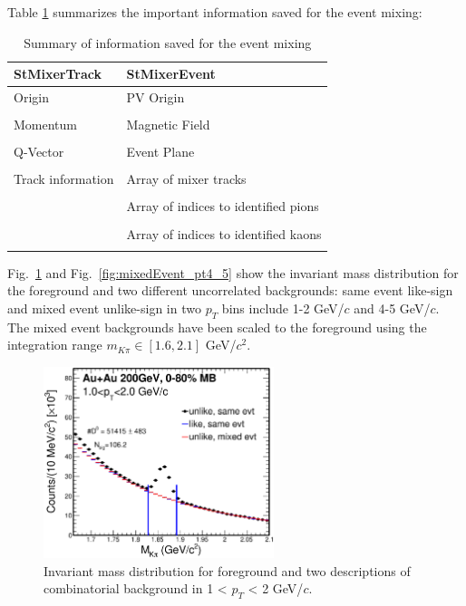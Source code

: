\documentclass[a4paper]{article}
\begin{document}
Table \ref{eventBuf} summarizes the important information saved for the event mixing:

\begin{table}[htp]
\centering
\caption{Summary of information saved for the event mixing}
\label{eventBuf}
\begin{tabular}{ l | l  }
\toprule[1.6pt]
StMixerTrack & StMixerEvent \\
\midrule[1.2pt]
Origin & PV Origin \\
\\
Momentum & Magnetic Field \\
\\
Q-Vector & Event Plane \\
\\
Track information & Array of mixer tracks \\
\\
  &Array of indices to identified pions \\
\\
  & Array of indices to identified kaons \\
\\
\bottomrule[1.6pt]
\end{tabular}
\end{table}

Fig.~\ref{fig:mixedEvent_pt1_2} and Fig.~\ref{fig:mixedEvent_pt4_5} show the invariant mass distribution for the foreground and two different uncorrelated backgrounds: same event like-sign and mixed event unlike-sign in two $p_T$ bins include 1-2 GeV/$c$ and 4-5 GeV/$c$. The mixed event backgrounds have been scaled to the foreground using the integration range $m_{K\pi}\in[1.6,2.1]$ GeV/$c^{2}$.

\begin{figure}[htbp]
\centering
\includegraphics[keepaspectratio,width=0.6\textwidth]{fig/Mixed_cent_1_9_pt_1_2.eps}
\caption{Invariant mass distribution for foreground and two descriptions of combinatorial background in 1 < $p_T$ < 2 GeV/$c$.}
\label{fig:mixedEvent_pt1_2}
\end{figure}
\end{document}
